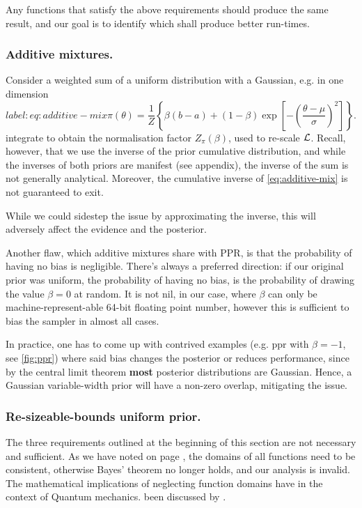 \documentclass[usenatbib]{mnras}
\begin{document}
Any functions that satisfy the above requirements should produce
the same result, and our goal is to identify which shall produce
better run-times.

\subsubsection{Additive mixtures.}
\label{sec:org1ab2b26}
Consider a weighted sum of a uniform distribution with
a Gaussian, e.g. in one dimension
\begin{equation}label:eq:additive-mix
  \pi(\theta) = \frac{1}{Z} \left\lbrace \beta (b - a) + (1-\beta) \exp \left[ -\left(\frac{\theta - \mu}{\sigma} \right)^{2}\right]\right\rbrace.
\end{equation}
integrate to obtain the normalisation factor \(Z_{\pi}(\beta)\),
used to re-scale \({\cal L}\). Recall, however, that we use the
inverse of the prior cumulative distribution, and while the
inverses of both priors are manifest (see appendix), the inverse
of the sum is not generally analytical. Moreover, the cumulative
inverse of \autoref{eq:additive-mix} is not guaranteed to exit.

While we could sidestep the issue by approximating the inverse,
this will adversely affect the evidence and the posterior.

Another flaw, which additive mixtures share with PPR, is that the
probability of having no bias is negligible. There's always a
preferred direction: if our original prior was uniform, the
probability of having no bias, is the probability of drawing the
value \(\beta=0\) at random. It is not nil, in our case, where
\(\beta\) can only be machine-represent-able 64-bit floating point
number, however this is sufficient to bias the sampler in almost
all cases.

In practice, one has to come up with contrived examples (e.g. ppr
with \(\beta=-1\), see \autoref{fig:ppr}) where said bias changes the
posterior or reduces performance, since by the central limit
theorem \textbf{most} posterior distributions are Gaussian. Hence, a
Gaussian variable-width prior will have a non-zero overlap,
mitigating the issue.

\subsubsection{Re-sizeable-bounds uniform prior.}
\label{sec:org0486387}

The three requirements outlined at the beginning of this section
are not necessary and sufficient. As we have noted on page
\pageref{domain-discussion}, the domains of all functions need to be
consistent, otherwise Bayes' theorem no longer holds, and our
analysis is invalid. The mathematical implications of neglecting
function domains have in the context of Quantum mechanics. been
discussed by \cite{Gieres_2000}.
\end{document}
